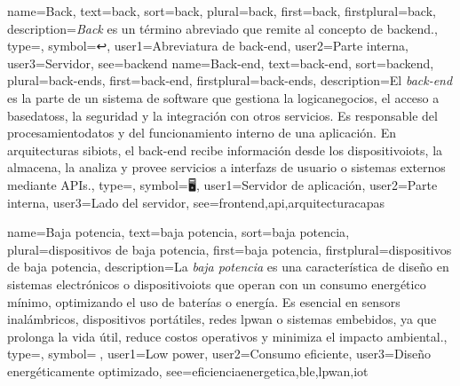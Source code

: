 	
	{
		name={Back},
		text={back},
		sort={back},
		plural={back},
		first={back},
		firstplural={back},
		description={\emph{Back} es un t{\'e}rmino abreviado que remite al concepto de \gls{backend}.},
		type=\glsdefaulttype,
		symbol={↩️},
		user1={Abreviatura de back-end},
		user2={Parte interna},
		user3={Servidor},
		see={backend}
	}
	{
		name={Back-end},
		text={back-end},
		sort={backend},
		plural={back-ends},
		first={back-end},
		firstplural={back-ends},
		description={El \emph{back-end} es la parte de un sistema de software que gestiona la \gls{logicanegocios}, el acceso a \glspl{basedatos}, la \gls{seguridad} y la integraci{\'o}n con otros servicios. Es responsable del \gls{procesamientodatos} y del funcionamiento interno de una aplicaci{\'o}n. En arquitecturas \glspl{sibiot}, el back-end recibe informaci{\'o}n desde los \glspl{dispositivoiot}, la almacena, la analiza y provee servicios a \glspl{interfaz} de usuario o sistemas externos mediante APIs.},
		type=\glsdefaulttype,
		symbol={🖥️},
		user1={Servidor de aplicaci{\'o}n},
		user2={Parte interna},
		user3={Lado del servidor},
		see={frontend,api,arquitecturacapas}
	}
	
	{
		name={Baja potencia},
		text={baja potencia},
		sort={baja potencia},
		plural={dispositivos de baja potencia},
		first={baja potencia},
		firstplural={dispositivos de baja potencia},
		description={La \emph{baja potencia} es una caracter{\'i}stica de dise{\~n}o en sistemas electr{\'o}nicos o \glspl{dispositivoiot} que operan con un consumo energ{\'e}tico m{\'i}nimo, optimizando el uso de bater{\'i}as o energ{\'i}a. Es esencial en \glspl{sensor} inal{\'a}mbricos, dispositivos port{\'a}tiles, redes \gls{lpwan} o sistemas embebidos, ya que prolonga la vida {\'u}til, reduce costos operativos y minimiza el impacto ambiental.},
		type=\glsdefaulttype,
		symbol={🔋},
		user1={Low power},
		user2={Consumo eficiente},
		user3={Dise{\~n}o energ{\'e}ticamente optimizado},
		see={eficienciaenergetica,ble,lpwan,iot}
	}
	
